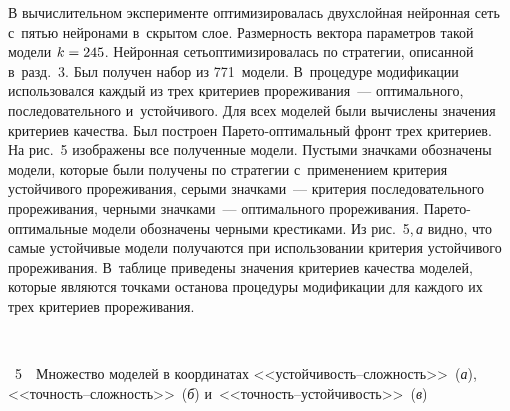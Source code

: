 \begin{multicols}{2}
В вычислительном эксперименте оптимизировалась двухслойная нейронная
сеть с~пятью нейронами в~скрытом слое. Размерность вектора
па\-ра\-метров такой модели $k\hm=245$. Нейронная сеть\linebreak оптимизировалась по
стратегии, описанной в~разд.~3. Был получен набор из 771~модели.
В~процедуре модификации использовался каждый из трех критериев
прореживания~--- оптимального, последовательного и~устойчивого. Для
всех моделей были вычислены значения критериев качества. Был\linebreak
построен Па\-ре\-то-опти\-маль\-ный фронт трех кри\-териев. На
рис.~5
изображены все полученные модели. Пустыми значками обозначены модели,
\mbox{которые} были получены по стратегии с~применением критерия
устойчивого прореживания, серыми значками~--- критерия
последовательного прореживания, черными
 значками~--- оптимального
прореживания. Па\-ре\-то-опти\-маль\-ные \mbox{модели} обозначены черными крестиками.
 Из
рис.~5,\,\textit{а} видно, что самые устойчивые модели получаются при
использовании критерия устойчивого прореживания. В~таблице приведены
значения критериев качества моделей, \mbox{которые} являются точками
останова процедуры модификации для каждого их трех критериев
прореживания.



\begin{center}  %
\vspace*{1pt}
\mbox{%
 \epsfxsize=77.734mm
 }
\end{center}

\vspace*{-12pt}

\noindent
{{\figurename~5}\ \ \small{Множество моделей в координатах <<устой\-чивость--слож\-ность>>~(\textit{а}),
<<точ\-ность--слож\-ность>>~(\textit{б}) и~<<точ\-ность--устой\-чивость>>~(\textit{в})}}


\vspace*{6pt}


\addtocounter{figure}{1}

\begin{table*}\small
\begin{center}



\end{center}
\end{table*}
\end{multicols}
